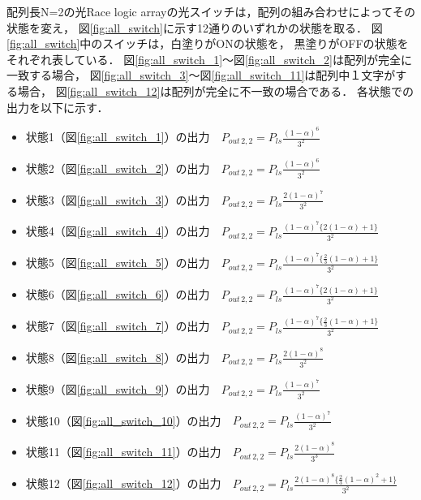 配列長N=2の光Race logic arrayの光スイッチは，配列の組み合わせによってその状態を変え，
図\ref{fig:all_switch}に示す12通りのいずれかの状態を取る．
図\ref{fig:all_switch}中のスイッチは，白塗りがONの状態を，
黒塗りがOFFの状態をそれぞれ表している．
図\ref{fig:all_switch_1}〜図\ref{fig:all_switch_2}は配列が完全に一致する場合，
図\ref{fig:all_switch_3}〜図\ref{fig:all_switch_11}は配列中１文字がする場合，
図\ref{fig:all_switch_12}は配列が完全に不一致の場合である．
各状態での出力を以下に示す．
\begin{itemize}
\item 状態1（図\ref{fig:all_switch_1}）の出力　$P_{out\,2,2}=P_{ls}\frac{(1-\alpha)^6}{3^2}$\\
\item 状態2（図\ref{fig:all_switch_2}）の出力　$P_{out\,2,2}=P_{ls}\frac{(1-\alpha)^6}{3^2}$\\
\item 状態3（図\ref{fig:all_switch_3}）の出力　$P_{out\,2,2}=P_{ls}\frac{2(1-\alpha)^7}{3^2}$\\
\item 状態4（図\ref{fig:all_switch_4}）の出力　$P_{out\,2,2}=P_{ls}\frac{(1-\alpha)^7\bigl\{2(1-\alpha)+1\bigl\}}{3^2}$\\
\item 状態5（図\ref{fig:all_switch_5}）の出力　$P_{out\,2,2}=P_{ls}\frac{(1-\alpha)^7\bigl\{\frac{2}{3}(1-\alpha)+1\bigl\}}{3^2}$\\
\item 状態6（図\ref{fig:all_switch_6}）の出力　$P_{out\,2,2}=P_{ls}\frac{(1-\alpha)^7\bigl\{2(1-\alpha)+1\bigl\}}{3^2}$\\
\item 状態7（図\ref{fig:all_switch_7}）の出力　$P_{out\,2,2}=P_{ls}\frac{(1-\alpha)^7\bigl\{\frac{2}{3}(1-\alpha)+1\bigl\}}{3^2}$\\
\item 状態8（図\ref{fig:all_switch_8}）の出力　$P_{out\,2,2}=P_{ls}\frac{2(1-\alpha)^8}{3^2}$\\
\item 状態9（図\ref{fig:all_switch_9}）の出力　$P_{out\,2,2}=P_{ls}\frac{(1-\alpha)^7}{3^2}$\\
\item 状態10（図\ref{fig:all_switch_10}）の出力　$P_{out\,2,2}=P_{ls}\frac{(1-\alpha)^7}{3^2}$\\
\item 状態11（図\ref{fig:all_switch_11}）の出力　$P_{out\,2,2}=P_{ls}\frac{2(1-\alpha)^8}{3^3}$\\
\item 状態12（図\ref{fig:all_switch_12}）の出力　$P_{out\,2,2}=P_{ls}\frac{2(1-\alpha)^8\bigl\{\frac{2}{3}(1-\alpha)^2+1\bigl\}}{3^2}$\\
\end{itemize}

